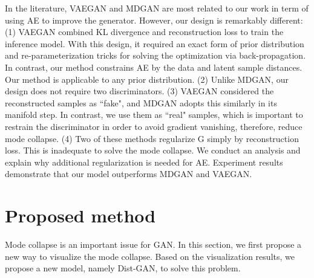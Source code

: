 \documentclass[runningheads]{llncs}
\begin{document}
In the literature, VAEGAN and MDGAN are most related to our work in term of using AE to improve the generator. However, our design is  remarkably different: (1) VAEGAN combined KL divergence and reconstruction loss to train the inference model. With this design, it required an exact form of prior distribution and re-parameterization tricks for solving the optimization via back-propagation. In contrast, our method constrains AE by the data and latent sample distances. Our method is applicable to any prior distribution. (2) Unlike MDGAN, our design  does not require two discriminators.  (3) VAEGAN considered the reconstructed samples as ``fake", and MDGAN adopts this similarly in its manifold step. In contrast, we use them as ``real" samples, which is important to restrain the discriminator in order to avoid gradient vanishing, therefore, reduce mode collapse. (4) Two of these methods regularize G simply by  reconstruction loss. This is inadequate to  solve the mode collapse. We conduct an  analysis  and explain why additional regularization is needed for AE. 
Experiment results demonstrate that our model outperforms MDGAN and VAEGAN.






































%
 
\section{Proposed method}
Mode collapse is an important issue for GAN. In this section, we first propose  a new way to visualize the mode collapse. Based on the visualization results, we propose a new model, namely Dist-GAN, to solve this problem.
\end{document}

